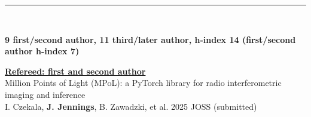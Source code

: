 \documentclass[10pt,preprint]{aastex}
\newcommand*{\xdash}[1][3em]{\rule[0.5ex]{#1}{0.7pt}}
\begin{document}


 \xdash[89.5ex] \\
\centerline{{\bf 9 first/second author, 11 third/later author, h-index 14 (first/second author h-index 7)}}

\noindent \underline{{\bf Refereed: first and second author}} \\
\noindent Million Points of Light (MPoL): a PyTorch library for radio interferometric imaging and inference \\
\indent I. Czekala, {\bf J. Jennings}, B. Zawadzki, et al. 2025 JOSS (submitted)
\end{document}
